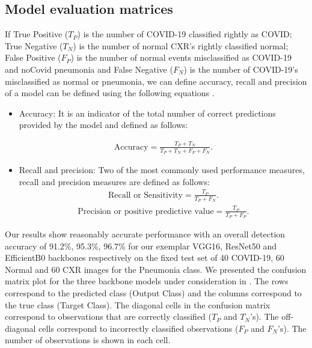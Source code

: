 \subsection{Model evaluation matrices}

If True Positive ($T_P$) is the number of COVID-19 classified
rightly as COVID; True Negative ($T_N$) is the number of normal
CXR's rightly classified normal; False Positive ($F_P$) is the
number of normal events misclassified as COVID-19 and noCovid pneumonia and False
Negative ($F_N$) is the number of COVID-19's misclassified as
normal or pneumonia, we can define accuracy, recall and precision of a model can be defined using the following equations \cite{SOKOLOVA2009}.

\begin{itemize}
\item {Accuracy: It is an indicator of the total number of correct predictions provided by the model and defined as follows:

\begin{align}
\text{Accuracy} =\frac{T_P+T_N}{T_P+T_N+F_P+F_N}.
\end{align}
}
\item {Recall and precision: Two of the most commonly used performance measures, recall and precision measures are defined as follows:
\begin{align}
\text{Recall or Sensitivity} =\frac{T_P}{T_P+F_N}.
\end{align}
\begin{align}
\text{Precision or positive predictive value} =\frac{T_P}{T_P+F_P}.
\end{align}}

 
\end{itemize}
Our results show reasonably accurate performance with an overall detection accuracy of  91.2\%, 95.3\%, 96.7\% for our exemplar VGG16, ResNet50 and EfficientB0 backbones respectively on the fixed test set of 40 COVID-19, 60 Normal and 60 CXR images for the Pneumonia class. We presented the confusion matrix plot for the three backbone models under consideration in . The rows correspond to the predicted class (Output Class) and the columns correspond to the true class (Target Class). The diagonal cells in the confusion matrix correspond to observations that are correctly classified ($T_P$ and $T_N$'s). The off-diagonal cells correspond to incorrectly classified observations ($F_P$ and $F_N$'s). The number of observations is shown in each cell.


